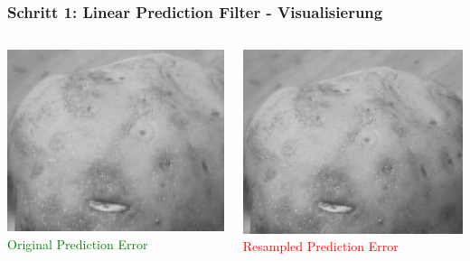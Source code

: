 \documentclass[11pt,t,usepdftitle=false,aspectratio=169]{beamer}
\begin{document}
\begin{frame}
	\frametitle{Schritt 1: Linear Prediction Filter - Visualisierung}
	
	\begin{columns}[T]
		\begin{column}{0.48\textwidth}
			\includegraphics[width=\textwidth]{images/examples_unedited/predicted_zoom.png}
			\textcolor{green}{\small Original Prediction Error}
		\end{column}
		\begin{column}{0.48\textwidth}
			\includegraphics[width=\textwidth]{images/examples_edited/predicted_zoom.png}
			\textcolor{red}{\small Resampled Prediction Error}
		\end{column}
	\end{columns}
\end{frame}
\end{document}

